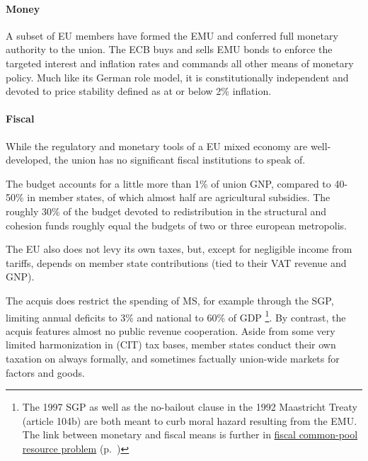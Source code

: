 \documentclass[11pt,a4paper,oneside]{article}
\begin{document}
\paragraph{Money} A subset of \gls{EU} members have formed the \gls{EMU} and conferred full monetary authority to the union.
The \gls{ECB} buys and sells \gls{EMU} bonds to enforce the targeted interest and inflation rates and commands all other means of monetary policy.
Much like its German role model, it is constitutionally independent and devoted to price stability defined as at or below 2\% inflation. %

\paragraph{Fiscal} While the regulatory and monetary tools of a \gls{EU} mixed economy are well-developed, the union has no significant fiscal institutions to speak of.


The budget accounts for a little more than 1\% of union \gls{GNP}, compared to 40-50\% in member states, of which almost half are agricultural subsidies.
The roughly 30\% of the budget devoted to redistribution in the structural and cohesion funds roughly equal the budgets of two or three european metropolis. %

The \gls{EU} also does not levy its own taxes, but, except for negligible income from tariffs, depends on member state contributions (tied to their \gls{VAT} revenue and \gls{GNP}).

The acquis does restrict the spending of \gls{MS}, for example through the \gls{SGP}, limiting annual deficits to 3\% and national to 60\% of \gls{GDP}
	\footnote{
		The 1997 \gls{SGP} as well as the no-bailout clause in the 1992 Maastricht Treaty (article 104b) are both meant to curb moral hazard resulting from the \gls{EMU}.
		The link between monetary and fiscal means is further in \hyperref[sec:fiscal-CPR]{fiscal common-pool resource problem} (p.~\pageref{sec:fiscal-CPR})
	}.%
By contrast, the acquis features almost no public revenue cooperation.
Aside from some very limited harmonization in (\gls{CIT}) tax bases, member states conduct their own taxation on always formally, and sometimes factually union-wide markets for factors and goods.
\end{document}
